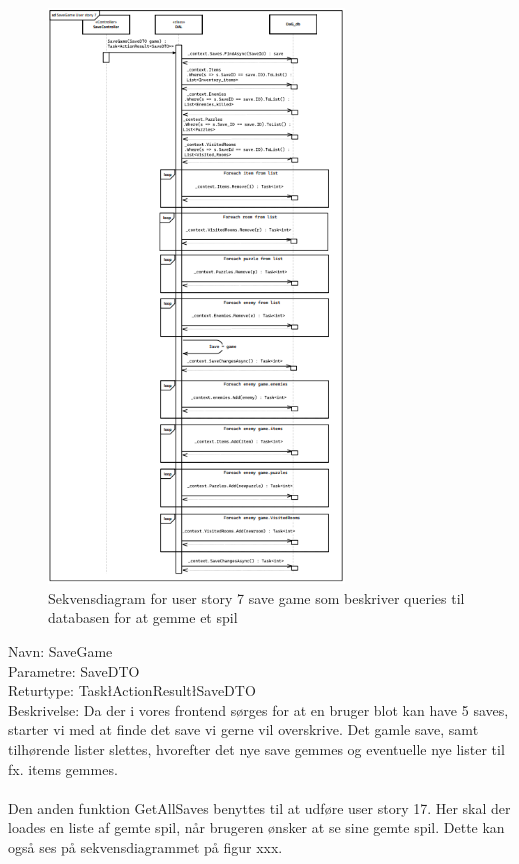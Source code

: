 \begin{figure}[H]
\centering
\includegraphics[width = 0.7\textwidth]{02-Body/Images/DAL-Database/SaveSd.PNG}
\caption{Sekvensdiagram for user story 7 save game som beskriver queries til databasen for at gemme et spil}
\label{fig:DAL-Sekvens-7}
\end{figure}


Navn: SaveGame\\
Parametre: SaveDTO\\
Returtype: Task\l ActionResult\l SaveDTO\g\g \\
Beskrivelse: Da der i vores frontend sørges for at en bruger blot kan have 5 saves, starter vi med at finde det save vi gerne vil overskrive. Det gamle save, samt tilhørende lister slettes, hvorefter det nye save gemmes og eventuelle nye lister til fx. items gemmes.\\\\

Den anden funktion GetAllSaves benyttes til at udføre user story 17.
Her skal der loades en liste af gemte spil, når brugeren ønsker at se sine gemte spil. Dette kan også ses på sekvensdiagrammet på figur xxx.\\\\

